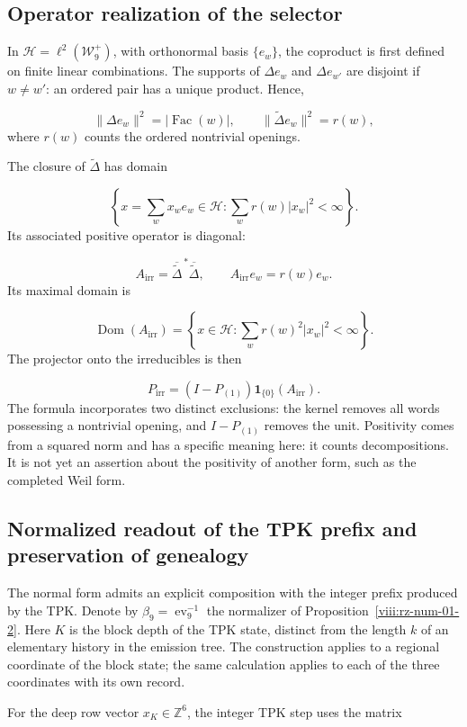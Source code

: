 \subsection{Operator realization of the selector}
In \(\mathcal H=\ell^2(\mathcal W_9^+)\), with orthonormal basis \(\{e_w\}\), the coproduct is first defined on finite linear combinations. The supports of $\Delta e_w$ and $\Delta e_{w'}$ are disjoint if $w\ne w'$: an ordered pair has a unique product. Hence,

\[
\|\Delta e_w\|^2=|\operatorname{Fac}(w)|,
\qquad
\|\widetilde\Delta e_w\|^2=r(w),
\]
where $r(w)$ counts the ordered nontrivial openings.

The closure of $\widetilde\Delta$ has domain

\[
\left\{x=\sum_wx_we_w\in\mathcal H:\sum_wr(w)|x_w|^2<\infty\right\}.
\]
Its associated positive operator is diagonal:

\[
A_{\mathrm{irr}}=\overline{\widetilde\Delta}^{\,*}\overline{\widetilde\Delta},
\qquad A_{\mathrm{irr}}e_w=r(w)e_w.
\]
Its maximal domain is

\[
\operatorname{Dom}(A_{\mathrm{irr}})
=\left\{x\in\mathcal H:\sum_wr(w)^2|x_w|^2<\infty\right\}.
\]
The projector onto the irreducibles is then

\[
P_{\mathrm{irr}}=(I-P_{(1)})\mathbf1_{\{0\}}(A_{\mathrm{irr}}).
\]
The formula incorporates two distinct exclusions: the kernel removes all words possessing a nontrivial opening, and $I-P_{(1)}$ removes the unit. Positivity comes from a squared norm and has a specific meaning here: it counts decompositions. It is not yet an assertion about the positivity of another form, such as the completed Weil form.

\subsection{Normalized readout of the TPK prefix and preservation of genealogy}
The normal form admits an explicit composition with the integer prefix produced by the TPK. Denote by \(\beta_9=\operatorname{ev}_9^{-1}\) the normalizer of Proposition~\ref{viii:rz-num-01-2}. Here \(K\) is the block depth of the TPK state, distinct from the length \(k\) of an elementary history in the emission tree. The construction applies to a regional coordinate of the block state; the same calculation applies to each of the three coordinates with its own record.

For the deep row vector \(x_K\in\mathbb Z^6\), the integer TPK step uses the matrix


